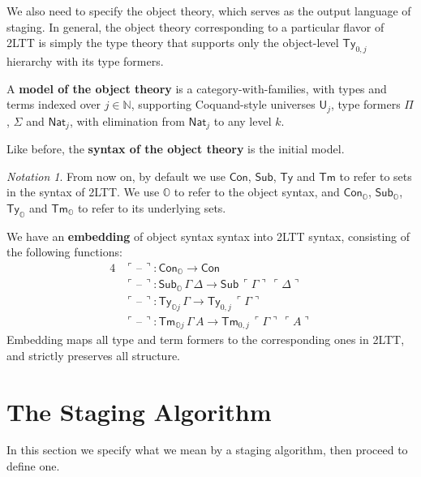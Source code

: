 \documentclass[acmsmall]{acmart}
\newcommand{\msf}[1]{\mathsf{#1}}
\newcommand{\mbb}[1]{\mathbb{#1}}
\newcommand{\mbbo}{\mbb{O}}
\newcommand{\ob}{_\mbbo}
\renewcommand{\U}{\msf{U}}
\newcommand{\Con}{\msf{Con}}
\newcommand{\Sub}{\msf{Sub}}
\newcommand{\Ty}{\msf{Ty}}
\newcommand{\Tm}{\msf{Tm}}
\newcommand{\Nat}{\msf{Nat}}
\newcommand{\blank}{{\mathord{\hspace{1pt}\text{--}\hspace{1pt}}}}
\newcommand{\emb}[1]{\ulcorner#1\urcorner}
\theoremstyle{remark}
\newtheorem{notation}{Notation}
\begin{document}
We also need to specify the object theory, which serves as the output language
of staging. In general, the object theory corresponding to a particular flavor
of 2LTT is simply the type theory that supports only the object-level $\Ty_{0,j}$
hierarchy with its type formers.

\begin{definition}
A \textbf{model of the object theory} is a category-with-families, with types and
terms indexed over $j \in \mbb{N}$, supporting Coquand-style universes $\U_j$,
type formers $\Pi$, $\Sigma$ and $\Nat_j$, with elimination from $\Nat_j$ to
any level $k$.
\end{definition}

\begin{definition}
Like before, the \textbf{syntax of the object theory} is the initial model.
\end{definition}

\begin{notation}
From now on, by default we use $\Con$, $\Sub$, $\Ty$ and $\Tm$ to refer to sets
in the syntax of 2LTT. We use $\mbbo$ to refer to the object syntax, and
$\Con\ob$, $\Sub\ob$, $\Ty\ob$ and $\Tm\ob$ to refer to its underlying sets.
\end{notation}

\begin{definition}
We have an \textbf{embedding} of object syntax syntax into 2LTT syntax, consisting
of the following functions:
\begin{alignat*}{4}
  & \emb{\blank} : \Con\ob \to \Con\\
  & \emb{\blank} : \Sub\ob\,\Gamma\,\Delta \to \Sub\,\emb{\Gamma}\,\emb{\Delta}\\
  & \emb{\blank} : \Ty_{\mbbo j}\,\Gamma \to \Ty_{0,j}\,\emb{\Gamma}\\
  & \emb{\blank} : \Tm_{\mbbo j}\,\Gamma\,A \to \Tm_{0,j}\,\emb{\Gamma}\,\emb{A}
\end{alignat*}
Embedding maps all type and term formers to the corresponding ones in 2LTT, and
strictly preserves all structure.
\end{definition}

\section{The Staging Algorithm}

In this section we specify what we mean by a staging algorithm, then proceed to
define one.
\end{document}
